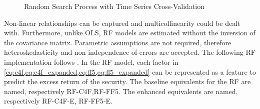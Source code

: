 \begin{figure}[H]
    \caption{Random Search Process with Time Series Cross-Validation}
    \end{figure}

    

Non-linear relationships can be captured and multicollinearity could be dealt with. Furthermore, unlike OLS, RF models are estimated without the inversion of the covariance matrix. Parametric assumptions are not required, therefore heteroskedasticity and non-independence of errors are accepted. The following RF implementation follows . In the RF model, each factor in \cref{eq:c4f,eq:c4f_expanded,eq:ff5,eq:ff5_expanded} can be represented as a feature to predict the excess return of the security. The baseline equivalents for the RF are named, respectively RF-C4F,RF-FF5. The enhanced equivalents are named, respectively RF-C4F-E, RF-FF5-E.


